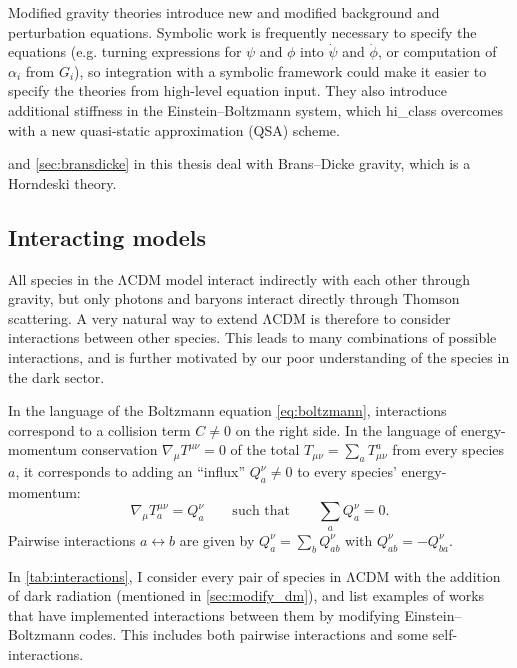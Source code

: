 \documentclass[USenglish, thumbmarks]{uiophdthesis} %
\newcommand\LCDM{\ensuremath{\mathrm{\Lambda CDM}}}
\newcommand\EB{Einstein--Boltzmann}
\newcommand\BD{Brans--Dicke}
\begin{document}
Modified gravity theories introduce new and modified background and perturbation equations.
Symbolic work is frequently necessary to specify the equations
(e.g. turning expressions for $\psi$ and $\phi$ into $\dot\psi$ and $\dot\phi$,
or computation of $\alpha_i$ from $G_i$),
so integration with a symbolic framework could make it easier to specify the theories from high-level equation input.
They also introduce additional stiffness in the \EB{} system,
which hi\_class overcomes with a new quasi-static approximation (QSA) scheme.

 and \cref{sec:bransdicke} in this thesis
deal with \BD{} gravity, which is a Horndeski theory.

\subsection{Interacting models}
\label{sec:modify_interacting}

All species in the \LCDM{} model interact indirectly with each other through gravity,
but only photons and baryons interact directly through Thomson scattering.
A very natural way to extend \LCDM{} is therefore to consider interactions between other species.
This leads to many combinations of possible interactions,
and is further motivated by our poor understanding of the species in the dark sector.

In the language of the Boltzmann equation \eqref{eq:boltzmann},
interactions correspond to a collision term $C \neq 0$ on the right side.
In the language of energy-momentum conservation $\nabla_\mu T^{\mu\nu} = 0$
of the total $T_{\mu\nu} = \sum_a T_{\mu\nu}^a$ from every species $a$,
it corresponds to adding an \enquote{influx} $Q^\nu_a \neq 0$ to every species' energy-momentum:
\begin{equation}
\nabla_\mu T^{\mu\nu}_a = Q^\nu_a
\qquad \text{such that} \qquad
\sum_a Q^\nu_a = 0.
\end{equation}
Pairwise interactions $a \leftrightarrow b$ are given by $Q^\nu_a = \sum_b Q^\nu_{ab}$ with $Q^\nu_{ab} = -Q^\nu_{ba}$.

In \cref{tab:interactions}, I consider every pair of species in \LCDM{} with the addition of dark radiation (mentioned in \cref{sec:modify_dm}),
and list examples of works that have implemented interactions between them by modifying \EB{} codes.
This includes both pairwise interactions and some self-interactions.
\end{document}
